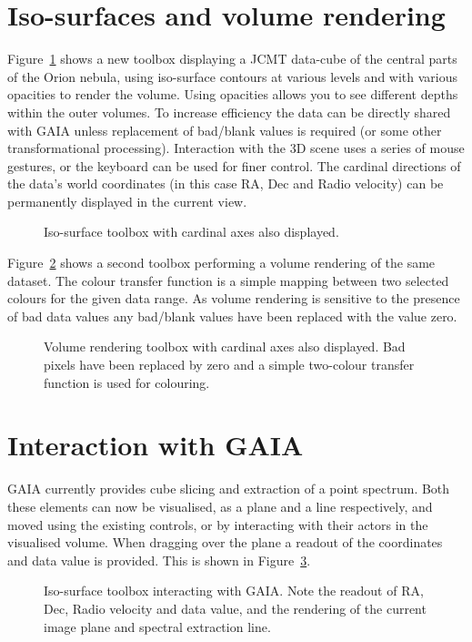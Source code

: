 \documentclass[11pt,twoside]{article}  %
\begin{document}
\section{Iso-surfaces and volume rendering}
Figure~\ref{P2.7-fig1} shows a new toolbox displaying a JCMT data-cube of the
central parts of the Orion nebula, using iso-surface contours at various
levels and with various opacities to render the volume. Using opacities allows
you to see different depths within the outer volumes. To increase efficiency
the data can be directly shared with GAIA unless replacement of bad/blank
values is required (or some other transformational processing). Interaction
with the 3D scene uses a series of mouse gestures, or the keyboard can be used
for finer control. The cardinal directions of the data's world coordinates (in
this case RA, Dec and Radio velocity) can be permanently displayed in the
current view.

\begin{figure}
\caption{Iso-surface toolbox with cardinal axes also displayed.}
\label{P2.7-fig1}
\end{figure}

Figure~\ref{P2.7-fig2} shows a second toolbox performing a volume rendering of
the same dataset. The colour transfer function is a simple mapping between two
selected colours for the given data range. As volume rendering is sensitive to
the presence of bad data values any bad/blank values have been replaced with
the value zero.

\begin{figure}
\caption{Volume rendering toolbox with cardinal axes also displayed. Bad
pixels have been replaced by zero and a simple two-colour transfer function is
used for colouring.}
\label{P2.7-fig2}
\end{figure}

\section{Interaction with GAIA}
GAIA currently provides cube slicing and extraction of a point spectrum. Both
these elements can now be visualised, as a plane and a line respectively, and
moved using the existing controls, or by interacting with their actors in the
visualised volume. When dragging over the plane a readout of the coordinates
and data value is provided. This is shown in Figure~\ref{P2.7-fig3}.

\begin{figure}
\caption{Iso-surface toolbox interacting with GAIA. Note the readout of RA,
Dec, Radio velocity and data value, and the rendering of the current image
plane and spectral extraction line.}
\label{P2.7-fig3}
\end{figure}
\end{document}
